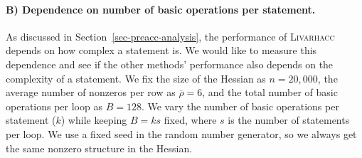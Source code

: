 \documentclass[12pt]{article}
\begin{document}
\paragraph{B) Dependence on number of basic operations per statement.}

As discussed in Section~\ref{sec-preacc-analysis}, the performance of \textsc{Livarhacc} depends on how complex a statement is. We would like to measure this dependence
and see if the other methods' performance also depends on the complexity of a statement. We fix the size of the Hessian as $n=20,000$, the average number of nonzeros per row as $\overline{\rho} = 6$, and the total number of basic operations per loop as $B=128$.
We vary the number of basic operations per statement ($k$) while keeping $B=k s$ fixed, where $s$ is the number of statements per loop. We use a fixed seed in the random number generator,
so we always get the same nonzero structure in the Hessian. 
\end{document}

